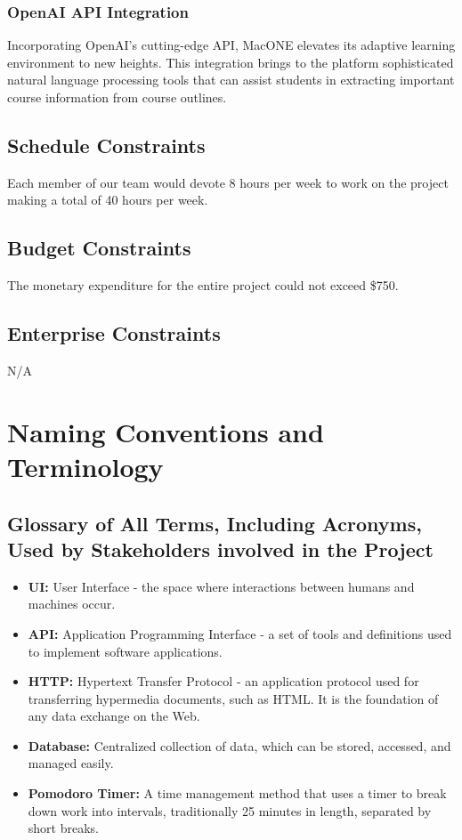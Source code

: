 \documentclass[12pt]{article}
\begin{document}
\subsubsection{OpenAI API Integration}
Incorporating OpenAI's cutting-edge API, MacONE elevates its adaptive learning environment to new heights. This integration brings to the platform sophisticated natural language processing tools that can assist students in extracting important course information from course outlines.

\subsection{Schedule Constraints}
Each member of our team would devote 8 hours per week to work on the project making a total of 40 hours per week.
\subsection{Budget Constraints}
The monetary expenditure for the entire project could not exceed \$750.
\subsection{Enterprise Constraints}
N/A

\section{Naming Conventions and Terminology}
\subsection{Glossary of All Terms, Including Acronyms, Used by Stakeholders involved in the Project}
\begin{itemize}
    \item \textbf{UI:} User Interface - the space where interactions between humans and machines occur.
    \item \textbf{API:} Application Programming Interface - a set of tools and definitions used to implement software applications.
    \item \textbf{HTTP:} Hypertext Transfer Protocol - an application protocol used for transferring hypermedia documents, such as HTML. It is the foundation of any data exchange on the Web.
    \item \textbf{Database:} Centralized collection of data, which can be stored, accessed, and managed easily.
    \item \textbf{Pomodoro Timer:} A time management method that uses a timer to break down work into intervals, traditionally 25 minutes in length, separated by short breaks.
\end{itemize}
\end{document}
